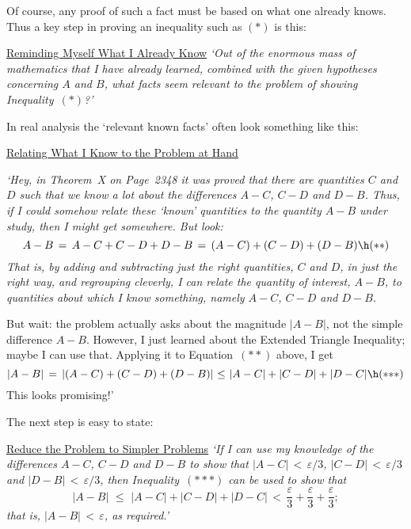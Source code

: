 \V

\noindent Of course, any proof of such a fact must be based on what one already knows. Thus a key step in proving an inequality such as $({\ast})$ is this:


       \h \underline{Reminding Myself What I Already Know} {\em `Out of the enormous mass of mathematics that I have already learned,
    combined with the given hypotheses concerning $A$ and $B$, what facts seem relevant to the problem of showing Inequality~$({\ast})$?'
    } %

\V

\noindent In real analysis the `relevant known facts' often look something like this:


        \h\underline{Relating What I Know to the Problem at Hand} {\em `Hey, in Theorem~X on Page~2348 it was proved that there are quantities $C$ and $D$ such that we know a lot about the differences $A-C$, $C-D$ and $D-B$.
    Thus, if I could somehow relate these `known' quantities to the quantity $A-B$ under study, then I might get somewhere.
    But look:
        \begin{displaymath}
        A-B \,=\, A-C+C-D+D-B \,=\, (A-C) + (C-D) +(D-B) \h ({\ast}{\ast})
        \end{displaymath}
    That is, by adding and subtracting just the right quantities, $C$ and $D$, in just the right way, and regrouping cleverly,
    I can relate the quantity of interest, $A-B$, to quantities about which I know something, namely $A-C$, $C-D$ and $D-B$.

        But wait: the problem actually asks about the magnitude $|A-B|$, not the simple difference $A-B$.
    However, I just learned about the Extended Triangle Inequality; maybe I can use that.
    Applying it to Equation~$({\ast}{\ast})$ above, I get
        \begin{displaymath}
        |A-B| \,=\, |(A-C) + (C-D) + (D-B)|\,\,{\leq}\,\,|A-C| + |C-D| + |D-C|
    \h ({\ast}{\ast}{\ast})
        \end{displaymath}
    This looks promising!'
    } %

\V

\noindent The next step is easy to state:


        \underline{Reduce the Problem to Simpler Problems}
        {\em `If I can use my knowledge of the differences $A-C$, $C-D$ and $D-B$ to show that $|A-C|\,<\,{\varepsilon}/3$, $|C-D|\,<\,{\varepsilon}/3$ and $|D-B|\,<\,{\varepsilon}/3$,
    then Inequality~$({\ast}{\ast}{\ast})$ can be used to show that
        \begin{displaymath}
        |A-B|\,\,{\leq}\,\,|A-C| + |C-D| + |D-C|\,<\,\frac{{\varepsilon}}{3} + \frac{{\varepsilon}}{3}+\frac{{\varepsilon}}{3};
        \end{displaymath}
    that is, $|A-B|\,<\,{\varepsilon}$, as required.' 
    } %

